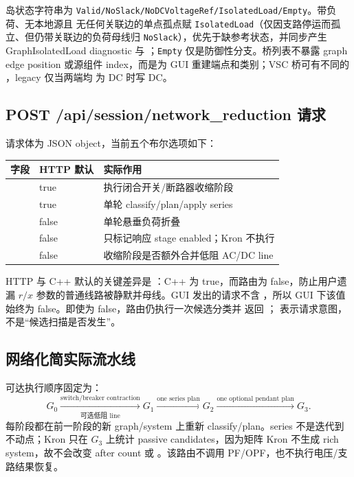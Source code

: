岛状态字符串为 \texttt{Valid/NoSlack/NoDCVoltageRef/IsolatedLoad/Empty}。带负荷、无本地源且
无任何关联边的单点孤点赋 \texttt{IsolatedLoad}（仅因支路停运而孤立、但仍带关联边的负荷母线归
\texttt{NoSlack}），优先于缺参考状态，并同步产生 GraphIsolatedLoad diagnostic 与
；\texttt{Empty} 仅是防御性分支。桥列表不暴露 graph edge position
或源组件 index，而是为 GUI
重建端点和类别；VSC 桥可有不同的 ，legacy  仅当两端均
为 DC 时写 DC。

\subsection{POST /api/session/network\_reduction 请求}

请求体为 JSON object，当前五个布尔选项如下：

\begin{center}\small
\begin{tabular}{@{}L{5.7cm}L{2.0cm}L{6.5cm}@{}}
\toprule
字段 & HTTP 默认 & 实际作用\\
\midrule
{} & true & 执行闭合开关/断路器收缩阶段\\
 & true & 单轮 classify/plan/apply series\\
 & false & 单轮悬垂负荷折叠\\
 & false & 只标记响应 stage enabled；Kron 不执行\\
 & false & 收缩阶段是否额外合并低阻 AC/DC line\\
\bottomrule
\end{tabular}
\end{center}

HTTP 与 C++ 默认的关键差异是 ：C++ 为 true，而路由为
false，防止用户遗漏
$r/x$ 参数的普通线路被静默并母线。GUI 发出的请求不含
，所以 GUI 下该值始终为 false。即使为 false，路由仍执行一次候选分类并
返回 ； 表示请求意图，不是“候选扫描是否发生”。

\subsection{网络化简实际流水线}

可达执行顺序固定为：
\begin{equation}
G_0\xrightarrow[\text{可选低阻 line}]{\text{switch/breaker contraction}}
G_1\xrightarrow{\text{one series plan}}G_2
\xrightarrow{\text{one optional pendant plan}}G_3.
\end{equation}
每阶段都在前一阶段的新 graph/system 上重新 classify/plan。series 不是迭代到不动点；Kron 只在
$G_3$ 上统计 passive candidates，因为矩阵 Kron 不生成 rich system，故不会改变 after count 或
。该路由不调用 PF/OPF，也不执行电压/支路结果恢复。

